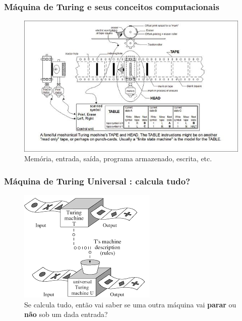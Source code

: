 \documentclass[10pt]{beamer}
\begin{document}
\begin{frame}[fragile]

\frametitle{ Máquina de Turing  e seus conceitos computacionais}
\begin{figure}[!ht]
	\centering
	
	\includegraphics[height =.65\textheight,width=.8\textwidth]
	{figuras/turing_machine_mecanica.jpg}
	\caption{Memória, entrada, saída, programa armazenado, escrita, etc.}
\end{figure}

\end{frame}




\begin{frame}[fragile]

\frametitle{ Máquina de Turing Universal : calcula tudo?}
\begin{figure}[!ht]
	\centering
	
	\includegraphics[height =.5\textheight,width=.8\textwidth]
	{figuras/ex_calc_TM.png}
	\caption{Se calcula tudo, então vai saber se uma outra máquina vai {\bf parar} ou \textbf{não}  sob um dada entrada?}
\end{figure}

\end{frame}
\end{document}
